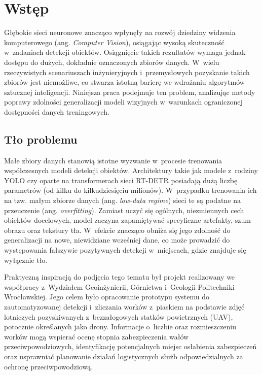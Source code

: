\chapter{Wstęp}

Głębokie sieci neuronowe znacząco wpłynęły na rozwój dziedziny widzenia komputerowego (ang. \textit{Computer Vision}), osiągając wysoką skuteczność w~zadaniach detekcji obiektów. Osiągnięcie takich rezultatów wymaga jednak dostępu do dużych, dokładnie oznaczonych zbiorów danych. W~wielu rzeczywistych scenariuszach inżynieryjnych i~przemysłowych pozyskanie takich zbiorów jest niemożliwe, co stwarza istotną barierę we wdrażaniu algorytmów sztucznej inteligencji. Niniejsza praca podejmuje ten problem, analizując metody poprawy zdolności generalizacji modeli wizyjnych w~warunkach ograniczonej dostępności danych treningowych.

\section{Tło problemu}

Małe zbiory danych stanowią istotne wyzwanie w~procesie trenowania współczesnych modeli detekcji obiektów. Architektury takie jak modele z~rodziny YOLO czy oparte na transformerach sieci RT-DETR posiadają dużą liczbę parametrów (od kilku do kilkudziesięciu milionów). W~przypadku trenowania ich na tzw. małym zbiorze danych (ang. \textit{low-data regime}) sieci te są podatne na przeuczenie (ang. \textit{overfitting}). Zamiast uczyć się ogólnych, niezmiennych cech obiektów docelowych, model zaczyna zapamiętywać specyficzne artefakty, szum obrazu oraz tekstury tła. W~efekcie znacząco obniża się jego zdolność do generalizacji na nowe, niewidziane wcześniej dane, co może prowadzić do występowania fałszywie pozytywnych detekcji w~miejscach, gdzie znajduje się wyłącznie tło.

Praktyczną inspiracją do podjęcia tego tematu był projekt realizowany we współpracy z~Wydziałem Geoinżynierii, Górnictwa i~Geologii Politechniki Wrocławskiej. Jego celem było opracowanie prototypu systemu do zautomatyzowanej detekcji i~zliczania worków z~piaskiem na podstawie zdjęć lotniczych pozyskiwanych z~bezzałogowych statków powietrznych (UAV), potocznie określanych jako drony. Informacje o~liczbie oraz rozmieszczeniu worków mogą wspierać ocenę stopnia zabezpieczenia wałów przeciwpowodziowych, identyfikację potencjalnych miejsc osłabienia zabezpieczeń oraz usprawniać planowanie działań logistycznych służb odpowiedzialnych za ochronę przeciwpowodziową.

